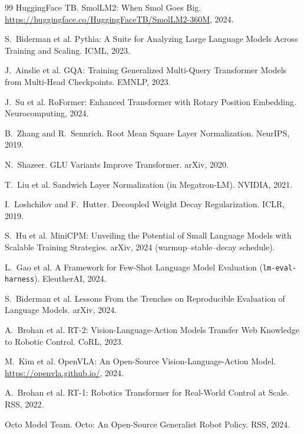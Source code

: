 \documentclass[11pt,a4paper]{article}
\begin{document}
\begin{thebibliography}{99}
HuggingFace TB.
\newblock SmolLM2: When Smol Goes Big.
\newblock \url{https://huggingface.co/HuggingFaceTB/SmolLM2-360M}, 2024.

S.~Biderman et al.
\newblock Pythia: A Suite for Analyzing Large Language Models Across Training and Scaling.
\newblock ICML, 2023.

J.~Ainslie et al.
\newblock GQA: Training Generalized Multi-Query Transformer Models from Multi-Head Checkpoints.
\newblock EMNLP, 2023.

J.~Su et al.
\newblock RoFormer: Enhanced Transformer with Rotary Position Embedding.
\newblock Neurocomputing, 2024.

B.~Zhang and R.~Sennrich.
\newblock Root Mean Square Layer Normalization.
\newblock NeurIPS, 2019.

N.~Shazeer.
\newblock GLU Variants Improve Transformer.
\newblock arXiv, 2020.

T.~Liu et al.
\newblock Sandwich Layer Normalization (in Megatron-LM).
\newblock NVIDIA, 2021.

I.~Loshchilov and F.~Hutter.
\newblock Decoupled Weight Decay Regularization.
\newblock ICLR, 2019.

S.~Hu et al.
\newblock MiniCPM: Unveiling the Potential of Small Language Models with Scalable Training Strategies.
\newblock arXiv, 2024 (warmup--stable--decay schedule).

L.~Gao et al.
\newblock A Framework for Few-Shot Language Model Evaluation (\texttt{lm-eval-harness}).
\newblock EleutherAI, 2024.

S.~Biderman et al.
\newblock Lessons From the Trenches on Reproducible Evaluation of Language Models.
\newblock arXiv, 2024.

A.~Brohan et al.
\newblock RT-2: Vision-Language-Action Models Transfer Web Knowledge to Robotic Control.
\newblock CoRL, 2023.

M.~Kim et al.
\newblock OpenVLA: An Open-Source Vision-Language-Action Model.
\newblock \url{https://openvla.github.io/}, 2024.

A.~Brohan et al.
\newblock RT-1: Robotics Transformer for Real-World Control at Scale.
\newblock RSS, 2022.

Octo Model Team.
\newblock Octo: An Open-Source Generalist Robot Policy.
\newblock RSS, 2024.


\end{thebibliography}
\end{document}
